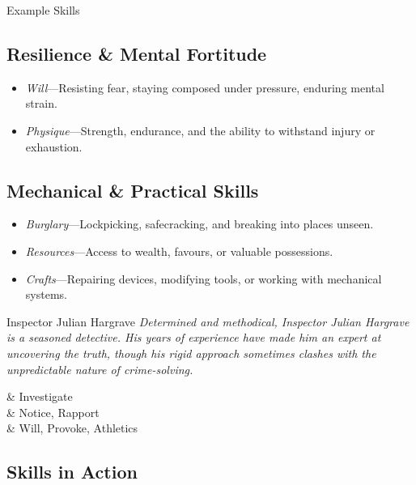 \begin{WyrdExampleSidebar}[float=!t]{Example Skills}
	\subsection*{Resilience \& Mental Fortitude}  
	\begin{itemize}
    	\item \emph{Will}---Resisting fear, staying composed under pressure, enduring mental strain.
	    \item \emph{Physique}---Strength, endurance, and the ability to withstand injury or exhaustion.
	\end{itemize}

	\subsection*{Mechanical \& Practical Skills}  
	\begin{itemize}
    	\item \emph{Burglary}---Lockpicking, safecracking, and breaking into places unseen.
	    \item \emph{Resources}---Access to wealth, favours, or valuable possessions.
	    \item \emph{Crafts}---Repairing devices, modifying tools, or working with mechanical systems.
	\end{itemize}
\end{WyrdExampleSidebar}

\begin{WyrdNPC}[float=!t]{Inspector Julian Hargrave}
	\emph{Determined and methodical, Inspector Julian Hargrave is a seasoned detective. His years of experience have made him an expert at uncovering the truth, though his rigid approach sometimes clashes with the unpredictable nature of crime-solving.}

	\vspace{0.5\baselineskip}
	\begin{SkillsBox}
		\Expert & Investigate \\
		\Skilled & Notice, Rapport \\
		\Novice & Will, Provoke, Athletics \\
	\end{SkillsBox}

\end{WyrdNPC}


\subsection{Skills in Action}

